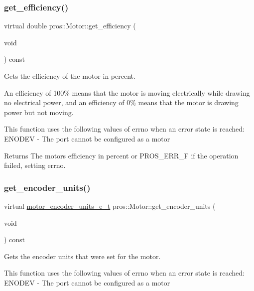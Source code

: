 \subsubsection{\texorpdfstring{get\+\_\+efficiency()}{get\_efficiency()}}
{\footnotesize\ttfamily virtual double pros\+::\+Motor\+::get\+\_\+efficiency (\begin{DoxyParamCaption}\item[{void}]{ }\end{DoxyParamCaption}) const\hspace{0.3cm}{\ttfamily [virtual]}}

Gets the efficiency of the motor in percent.

An efficiency of 100\% means that the motor is moving electrically while drawing no electrical power, and an efficiency of 0\% means that the motor is drawing power but not moving.

This function uses the following values of errno when an error state is reached\+: E\+N\+O\+D\+EV -\/ The port cannot be configured as a motor

\begin{DoxyReturn}{Returns}
The motor\textquotesingle{}s efficiency in percent or P\+R\+O\+S\+\_\+\+E\+R\+R\+\_\+F if the operation failed, setting errno. 
\end{DoxyReturn}
\mbox{\label{classpros_1_1Motor_a9fd37f3efa2f903bda8bf575b0052fd2}} 
\subsubsection{\texorpdfstring{get\+\_\+encoder\+\_\+units()}{get\_encoder\_units()}}
{\footnotesize\ttfamily virtual \hyperlink{motors_8h_a6677ba23760c558fd8b7b4e1e00a6123}{motor\+\_\+encoder\+\_\+units\+\_\+e\+\_\+t} pros\+::\+Motor\+::get\+\_\+encoder\+\_\+units (\begin{DoxyParamCaption}\item[{void}]{ }\end{DoxyParamCaption}) const\hspace{0.3cm}{\ttfamily [virtual]}}

Gets the encoder units that were set for the motor.

This function uses the following values of errno when an error state is reached\+: E\+N\+O\+D\+EV -\/ The port cannot be configured as a motor

